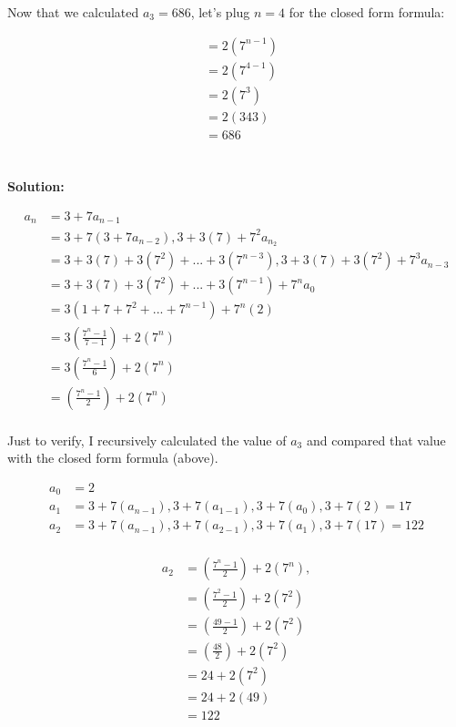\documentclass{article}
\begin{document}
Now that we calculated $a_3 = 686$, let's plug $n=4$ for the closed form formula:

\begin{align*}
&= 2(7^{n-1}) \\
&= 2(7^{4-1}) \\
&= 2(7^{3}) \\
&= 2(343) \\
&= 686
\end{align*}

\newpage

\section{}

\textbf{Solution: }

\begin{align*}
a_{n} &= 3 + 7a_{n-1} \\
    &= 3 + 7(3 + 7a_{n-2}), 3 + 3(7) + 7^{2}a_{n_2} \\
    &= 3 + 3(7) + 3(7^2) + ... + 3(7^{n-3}), 3 + 3(7) + 3(7^2) + 7^3a_{n-3} \\
    &= 3 + 3(7) + 3(7^2) + ... + 3(7^{n-1}) + 7^{n}a_0 \\
    &= 3(1 + 7 + 7^2 + ... + 7^{n-1}) + 7^n(2) \\
    &= 3(\frac{7^n-1}{7-1}) + 2(7^n) \\
    &= 3(\frac{7^n-1}{6}) + 2(7^n) \\
    &= (\frac{7^n-1}{2}) + 2(7^n) \\
\end{align*}

Just to verify, I recursively calculated the value of $a_3$ and compared that value with the closed form formula (above).

\begin{align*}
a_{0} &= 2 \\
a_{1} &= 3 + 7(a_{n-1}), 3 + 7(a_{1-1}), 3 + 7(a_{0}), 3 + 7(2) = 17 \\
a_{2} &= 3 + 7(a_{n-1}), 3 + 7(a_{2-1}), 3 + 7(a_{1}), 3 + 7(17) = 122 \\
\end{align*}

\begin{align*}
a_{2} &= (\frac{7^n-1}{2}) + 2(7^n),   \\ 
      &= (\frac{7^{2}-1}{2}) + 2(7^2) \\
      &= (\frac{49-1}{2}) + 2(7^2) \\
      &= (\frac{48}{2}) + 2(7^2) \\
      &= 24 + 2(7^2) \\
      &= 24 + 2(49) \\
      &= 122 \\
\end{align*}
\end{document}
